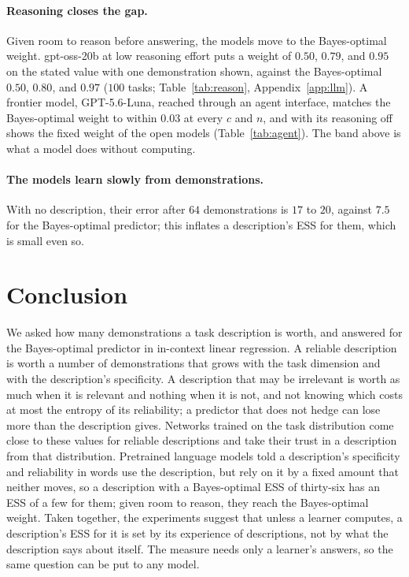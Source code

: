 \documentclass{article}
\begin{document}
\paragraph{Reasoning closes the gap.} Given room to reason before answering, the models move to the Bayes-optimal weight. gpt-oss-20b at low reasoning effort puts a weight of $0.50$, $0.79$, and $0.95$ on the stated value with one demonstration shown, against the Bayes-optimal $0.50$, $0.80$, and $0.97$ ($100$ tasks; Table~\ref{tab:reason}, Appendix~\ref{app:llm}). A frontier model, GPT-5.6-Luna, reached through an agent interface, matches the Bayes-optimal weight to within $0.03$ at every $c$ and $n$, and with its reasoning off shows the fixed weight of the open models (Table~\ref{tab:agent}). The band above is what a model does without computing.

\paragraph{The models learn slowly from demonstrations.} With no description, their error after $64$ demonstrations is $17$ to $20$, against $7.5$ for the Bayes-optimal predictor; this inflates a description's ESS for them, which is small even so.

\section{Conclusion}
We asked how many demonstrations a task description is worth, and answered for the Bayes-optimal predictor in in-context linear regression. A reliable description is worth a number of demonstrations that grows with the task dimension and with the description's specificity. A description that may be irrelevant is worth as much when it is relevant and nothing when it is not, and not knowing which costs at most the entropy of its reliability; a predictor that does not hedge can lose more than the description gives. Networks trained on the task distribution come close to these values for reliable descriptions and take their trust in a description from that distribution. Pretrained language models told a description's specificity and reliability in words use the description, but rely on it by a fixed amount that neither moves, so a description with a Bayes-optimal ESS of thirty-six has an ESS of a few for them; given room to reason, they reach the Bayes-optimal weight. Taken together, the experiments suggest that unless a learner computes, a description's ESS for it is set by its experience of descriptions, not by what the description says about itself. The measure needs only a learner's answers, so the same question can be put to any model.
\end{document}
